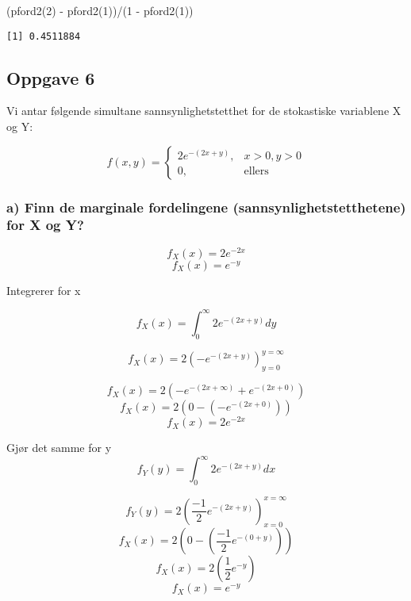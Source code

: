 \documentclass[
  12pt,
  a4paper,
  DIV=11,
  numbers=noendperiod]{scrartcl}
\newenvironment{Shaded}{\begin{snugshade}}{\end{snugshade}}
\newcommand{\DecValTok}[1]{\textcolor[rgb]{0.68,0.00,0.00}{#1}}
\newcommand{\FunctionTok}[1]{\textcolor[rgb]{0.28,0.35,0.67}{#1}}
\newcommand{\NormalTok}[1]{\textcolor[rgb]{0.00,0.23,0.31}{#1}}
\newcommand{\SpecialCharTok}[1]{\textcolor[rgb]{0.37,0.37,0.37}{#1}}
\begin{document}
\begin{Shaded}
\begin{Highlighting}[]
\NormalTok{(}\FunctionTok{pford2}\NormalTok{(}\DecValTok{2}\NormalTok{) }\SpecialCharTok{{-}} \FunctionTok{pford2}\NormalTok{(}\DecValTok{1}\NormalTok{))}\SpecialCharTok{/}\NormalTok{(}\DecValTok{1} \SpecialCharTok{{-}} \FunctionTok{pford2}\NormalTok{(}\DecValTok{1}\NormalTok{))}
\end{Highlighting}
\end{Shaded}

\begin{verbatim}
[1] 0.4511884
\end{verbatim}

\subsection{Oppgave 6}\label{oppgave-6}

Vi antar følgende simultane sannsynlighetstetthet for de stokastiske
variablene X og Y:

\[
f(x,y) = 
\begin{cases} 
2e^{-(2x+y)}, & x > 0, y > 0 \\
0, & \text{ellers}
\end{cases}
\]

\subsubsection{a) Finn de marginale fordelingene
(sannsynlighetstetthetene) for X og
Y?}\label{a-finn-de-marginale-fordelingene-sannsynlighetstetthetene-for-x-og-y}

\[f_X(x) = 2e^{-2x}\] \[f_X(x) = e^{-y}\]

Integrerer for x

\[f_X(x) = \int_0^\infty 2e^{-(2x+y)} dy\]

\[f_X(x) = 2\left(-e^{-(2x+y)}\right)_{y=0}^{y=\infty}\]

\[f_X(x) = 2\left(-e^{-(2x+\infty)} + e^{-(2x+0)}\right)\]
\[f_X(x) = 2\left(0 - (-e^{-(2x+0)})\right)\] \[f_X(x) = 2e^{-2x}\]

Gjør det samme for y \[f_Y(y) = \int_0^\infty 2e^{-(2x+y)} dx\]

\[f_Y(y) = 2\left(\frac{-1}{2}e^{-(2x+y)}\right)_{x=0}^{x=\infty}\]
\[f_X(x) = 2\left(0 - (\frac{-1}{2}e^{-(0+y)})\right)\]
\[f_X(x) = 2\left( \frac{1}{2}e^{-y}\right)\] \[f_X(x) = e^{-y}\]
\end{document}

